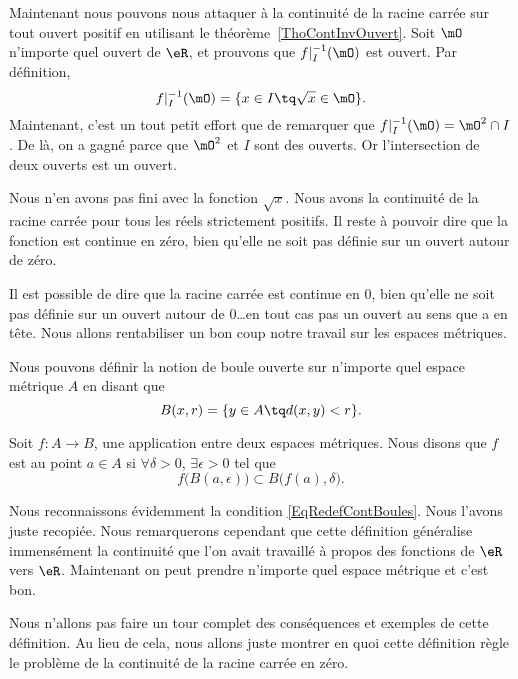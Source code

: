 Maintenant nous pouvons nous attaquer à la continuité de la racine carrée sur tout ouvert positif en utilisant le théorème~\ref{ThoContInvOuvert}. Soit \( \mO\) n'importe quel ouvert de \( \eR\), et prouvons que \( f|_I^{-1}(\mO)\) est ouvert. Par définition,
\begin{equation}
	f|_I^{-1}(\mO)=\{ x\in I\tq \sqrt{x}\in\mO \}.
\end{equation}
Maintenant, c'est un tout petit effort que de remarquer que \( f|_I^{-1}(\mO)=\mO^2\cap I\). De là, on a gagné parce que \( \mO^2\) et \( I\) sont des ouverts. Or l'intersection de deux ouverts est un ouvert.

Nous n'en avons pas fini avec la fonction \( \sqrt{x}\). Nous avons la continuité de la racine carrée pour tous les réels strictement positifs. Il reste à pouvoir dire que la fonction est continue en zéro, bien qu'elle ne soit pas définie sur un ouvert autour de zéro.

Il est possible de dire que la racine carrée est continue en \( 0\), bien qu'elle ne soit pas définie sur un ouvert autour de \( 0\)\ldots en tout cas pas un ouvert au sens que  a en tête. Nous allons rentabiliser un bon coup notre travail sur les espaces métriques.

Nous pouvons définir la notion de boule ouverte sur n'importe quel espace métrique \( A\) en disant que
\[
	B(x,r)=\{ y\in A\tq d(x,y)<r \}.
\]
\begin{definition}      \label{DefContMetrique}
	Soit \( f\colon A\to B\), une application entre deux espaces métriques. Nous disons que \( f\) est  au point \( a\in A\) si \( \forall \delta>0\), \( \exists\epsilon>0\) tel que
	\begin{equation}
		f\big( B(a,\epsilon) \big)\subset B\big( f(a),\delta \big).
	\end{equation}
\end{definition}
Nous reconnaissons évidemment la condition \eqref{EqRedefContBoules}. Nous l'avons juste recopiée. Nous remarquerons cependant que cette définition généralise immensément la continuité que l'on avait travaillé à propos des fonctions de \( \eR\) vers \( \eR\). Maintenant on peut prendre n'importe quel espace métrique et c'est bon.

Nous n'allons pas faire un tour complet des conséquences et exemples de cette définition. Au lieu de cela, nous allons juste montrer en quoi cette définition règle le problème de la continuité de la racine carrée en zéro.

